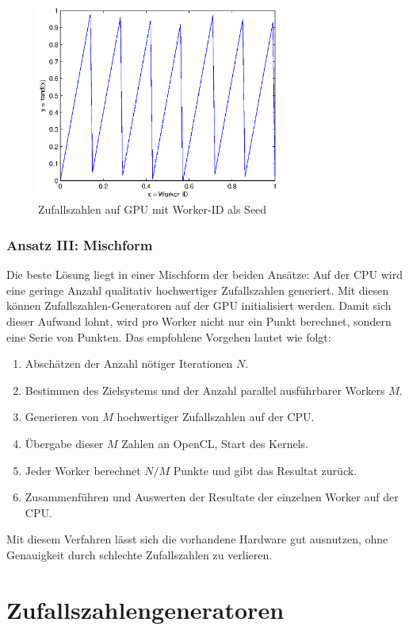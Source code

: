 \documentclass{book}
\begin{document}
\begin{refsection}
\begin{figure}[htbp]
	\centering
	\includegraphics[width=8cm]{images/idAsSeed.eps}
	\caption{Zufallszahlen auf GPU mit Worker-ID als Seed}
	\label{fig:OpenCL_ID_Seed}
\end{figure}

\subsubsection{Ansatz III: Mischform}
Die beste Lösung liegt in einer Mischform der beiden Ansätze: Auf der CPU wird eine geringe Anzahl qualitativ hochwertiger Zufallszahlen generiert. Mit diesen können Zufallszahlen-Generatoren auf der GPU initialisiert werden. Damit sich dieser Aufwand lohnt, wird pro Worker nicht nur ein Punkt berechnet, sondern eine Serie von Punkten. Das empfohlene Vorgehen lautet wie folgt:
\begin{enumerate}
	\item Abschätzen der Anzahl nötiger Iterationen $N$.
	\item Bestimmen des Zielsystems und der Anzahl parallel ausführbarer Workers $M$.
	\item Generieren von $M$ hochwertiger Zufallszahlen auf der CPU.
	\item Übergabe dieser $M$ Zahlen an OpenCL, Start des Kernels.
	\item Jeder Worker berechnet $N/M$ Punkte und gibt das Resultat zurück.
	\item Zusammenführen und Auswerten der Resultate der einzelnen Worker auf der CPU.
\end{enumerate}

Mit diesem Verfahren lässt sich die vorhandene Hardware gut ausnutzen, ohne Genauigkeit durch schlechte Zufallszahlen zu verlieren. 

\clearpage
\section{Zufallszahlengeneratoren} 


\end{refsection}
\end{document}
